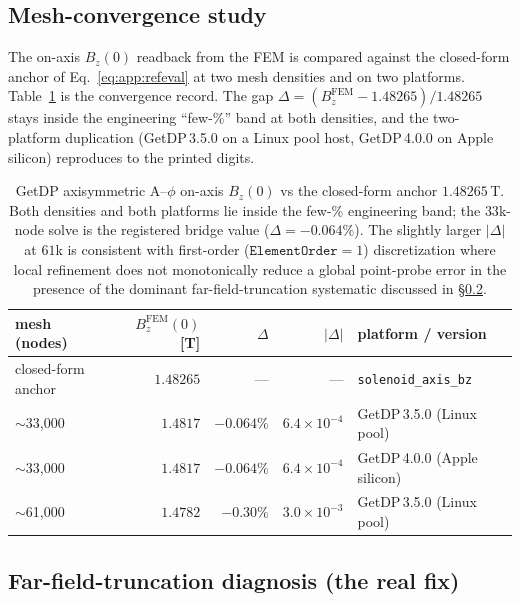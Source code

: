 \subsection{Mesh-convergence study}
\label{app:magnet:converge}

The on-axis $B_z(0)$ readback from the FEM is compared against the
closed-form anchor of Eq.~\eqref{eq:app:refeval} at two mesh densities and on
two platforms. Table~\ref{tab:app:mesh} is the convergence record. The gap
$\Delta = (B_z^{\text{FEM}} - 1.48265)/1.48265$ stays inside the engineering
``few-\%'' band at both densities, and the two-platform duplication
(GetDP\,3.5.0 on a Linux pool host, GetDP\,4.0.0 on Apple silicon) reproduces
to the printed digits.

\begin{table}[h]
\centering
\small
\begin{tabular}{lrrrl}
\toprule
mesh (nodes) & $B_z^{\text{FEM}}(0)$ [T] & $\Delta$ & $|\Delta|$ & platform / version \\
\midrule
closed-form anchor & $1.48265$ & --- & --- & \texttt{solenoid\_axis\_bz} \\
$\sim$33{,}000      & $1.4817$  & $-0.064\%$ & $6.4\times10^{-4}$ & GetDP\,3.5.0 (Linux pool) \\
$\sim$33{,}000      & $1.4817$  & $-0.064\%$ & $6.4\times10^{-4}$ & GetDP\,4.0.0 (Apple silicon) \\
$\sim$61{,}000      & $1.4782$  & $-0.30\%$  & $3.0\times10^{-3}$ & GetDP\,3.5.0 (Linux pool) \\
\bottomrule
\end{tabular}
\caption{GetDP axisymmetric A--$\phi$ on-axis $B_z(0)$ vs the closed-form
anchor $1.48265$\,T. Both densities and both platforms lie inside the few-\%
engineering band; the $33$k-node solve is the registered bridge value
($\Delta=-0.064\%$). The slightly larger $|\Delta|$ at $61$k is consistent
with first-order ($\texttt{ElementOrder}=1$) discretization where local
refinement does not monotonically reduce a global point-probe error in the
presence of the dominant far-field-truncation systematic discussed in
\S\ref{app:magnet:farfield}.}
\label{tab:app:mesh}
\end{table}

\subsection{Far-field-truncation diagnosis (the real fix)}
\label{app:magnet:farfield}

